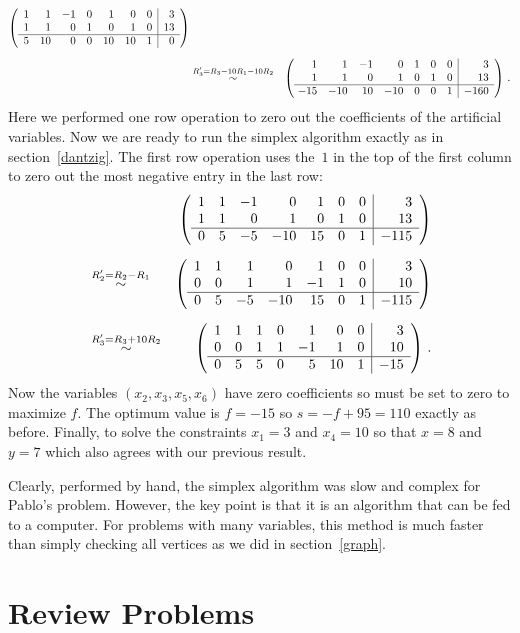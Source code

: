 \begin{example}
\begin{eqnarray*}
\left(\begin{array}{rrrrrrr|r}
1&1&-1&0&1&0&0&3\\
1&1&0&1&0&1&0&13\\\hline
5&10&\ 0&0&10&10&1&0
\end{array}\right)\\[2mm]
&\stackrel{\small R_3'=R_3-10 R_1-10R_2 }\sim&
\left(\begin{array}{rrrrrrr|r}
1&1&-1&0&1&0&0&3\\
1&1&0&1&0&1&0&13\\\hline
\!-15&-10&\ 10&-10&0&0&1&-160
\end{array}\right)
\, .
\end{eqnarray*}
Here we performed one row operation to zero out the coefficients of the artificial variables.
Now we are ready to run the simplex algorithm exactly as in section~\ref{dantzig}. The first row operation 
uses the~$1$ in the top of the first column to zero out the most negative entry in the last row:
\begin{eqnarray*}&&
\left(\begin{array}{rrrrrrr|r}
1&1&-1&0&1&0&0&3\\
1&1&0&1&0&1&0&13\\\hline
0&5&-5&-10&15&0&1&-115
\end{array}\right)\\[2mm]
&\stackrel{\small R_2'=R_2-R_1}\sim&
\left(\begin{array}{rrrrrrr|r}
1&1&1&0&1&0&0&3\\
0&0&1&1&-1&1&0&10\\\hline
0&5&-5&-10&15&0&1&-115
\end{array}\right)\\[2mm]
&\stackrel{\small R_3'=R_3+10R_2}\sim&
\left(\begin{array}{rrrrrrr|r}
1&1&1&0&1&0&0&3\\
0&0&1&1&-1&1&0&10\\\hline
0&5&5&0&5&10&1&-15
\end{array}\right)
\, .
\end{eqnarray*}
Now the variables $(x_2,x_3,x_5,x_6)$ have zero coefficients so must be set to zero to maximize $f$.
The optimum value is $f=-15$ so $s=-f+95=110$ exactly as before. Finally, to solve the constraints $x_1=3$
and $x_4=10$ so that $x=8$ and $y=7$ which also agrees with our previous result.
 \end{example}


Clearly, performed by hand,  the simplex algorithm was slow and complex for Pablo's problem. However, the key point is
that it is an algorithm that can be fed to a computer. For problems with many variables, this method is much faster than 
simply checking all vertices as we did in section~\ref{graph}.

\section{Review Problems}





